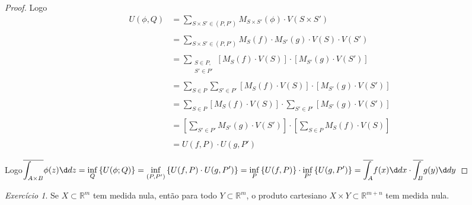 \documentclass{article}
\theoremstyle{plain}
\theoremstyle{definition}
\theoremstyle{remark}
\newtheorem{exercicio}{Exercício}[subsection]
\begin{document}
\begin{proof}
	Logo 
	\begin{align*}
		U(\phi, Q)  &= \displaystyle \sum_{S\times S'\in (P,P')} M_{S\times S'}(\phi) \cdot V(S\times S') \\~\\
		&=\displaystyle \sum_{S\times S'\in (P,P')} M_{S}(f) \cdot M_{S'}(g)\cdot V(S)\cdot V(S') \\~\\
		&=\displaystyle \sum_{\substack{S \in P, \\ S'\in P'}}\left[ M_{S}(f)\cdot V(S) \right] \cdot \left[ M_{S'}(g)\cdot V(S') \right] \\~\\
		&=\displaystyle \sum_{S \in P} \sum_{S'\in P'} \left[ M_{S}(f)\cdot V(S) \right] \cdot \left[ M_{S'}(g)\cdot V(S') \right] \\~\\
		&=\displaystyle \sum_{S \in P}\left[ M_{S}(f)\cdot V(S) \right] \cdot \sum_{S'\in P'}  \left[ M_{S'}(g)\cdot V(S') \right] \\~\\
		&=\displaystyle \left[ \sum_{S'\in P'}   M_{S'}(g)\cdot V(S') \right]\cdot  \left[\sum_{S \in P} M_{S}(f)\cdot V(S) \right] \\~\\
		&=U(f,P)  \cdot U(g,P') 
	\end{align*}

	Logo$ \displaystyle\overline{\int_{A\times B}} \phi(z) \d dz = \inf_{Q}\left\{ U(\phi; Q)\right\} = \inf_{(P,P')}\left\{ U(f, P) \cdot U(g,P') \right\} = \inf_{P}\left\{ U(f,P)\right\} \cdot\inf_{P'}\left\{ U(g,P')\right\} = \overline{\int_{A}} f(x) \d dx \cdot \overline{\int_{ B}} g(y) \d dy $

\end{proof}
\begin{exercicio}
	Se $X\subset \mathbb{R}^m$ tem medida nula, então  para todo $Y \subset \mathbb{R}^m$, o produto cartesiano $X\times Y \subset \mathbb{R}^{m+n}$ tem medida nula.
\end{exercicio}
\end{document}
